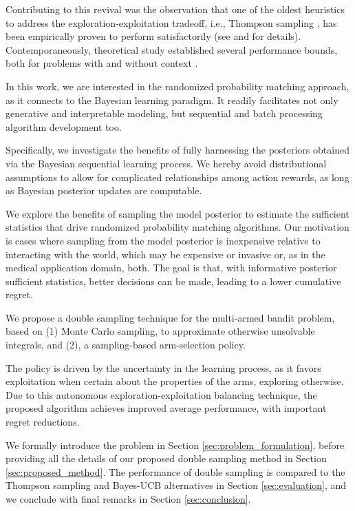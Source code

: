 \documentclass{article}
\newcommand{\ie}{i.e., }
\begin{document}
Contributing to this revival was the observation that
one of the oldest heuristics to address the exploration-exploitation tradeoff, \ie Thompson sampling \cite{j-Thompson1935,j-Thompson1933}, has been empirically proven to perform satisfactorily (see \cite{ic-Chapelle2011} and \cite{j-Scott2015} for details). Contemporaneously, theoretical study established several performance bounds, both for problems with and without context \cite{j-Agrawal2012,j-Agrawal2012a,ic-Korda2013,j-Russo2014,j-Russo2016}.

In this work, we are interested in the randomized probability matching approach, as it connects to the Bayesian learning paradigm. It readily facilitates not only generative and interpretable modeling, but sequential and batch processing algorithm development too.

Specifically, we investigate the benefits of fully harnessing the posteriors obtained via the Bayesian sequential learning process. We hereby avoid distributional assumptions to allow for complicated relationships among action rewards, as long as Bayesian posterior updates are computable.

We explore the benefits of sampling the model posterior to estimate the sufficient statistics that drive randomized probability matching algorithms. Our motivation is cases where sampling from the model posterior is inexpensive relative to interacting with the world, which may be expensive or invasive or, as in the medical application domain, both. The goal is that, with informative posterior sufficient statistics, better decisions can be made, leading to a lower cumulative regret.

We propose a double sampling technique for the multi-armed bandit problem, based on (1) Monte Carlo sampling, to approximate otherwise unsolvable integrals, and (2), a sampling-based arm-selection policy.

The policy is driven by the uncertainty in the learning process, as it favors exploitation when certain about the properties of the arms, exploring otherwise. Due to this autonomous exploration-exploitation balancing technique, the proposed algorithm achieves improved average performance, with important regret reductions.

We formally introduce the problem in Section \ref{sec:problem_formulation}, before providing all the details of our proposed double sampling method in Section \ref{sec:proposed_method}. The performance of double sampling is compared to the Thompson sampling and Bayes-UCB alternatives in Section \ref{sec:evaluation}, and we conclude with final remarks in Section \ref{sec:conclusion}.
\end{document}
